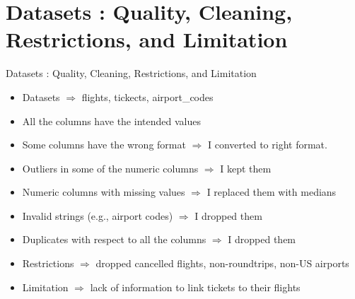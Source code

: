 \documentclass[aspectratio=1610]{beamer}
\begin{document}
\section{Datasets : Quality, Cleaning, Restrictions, and Limitation}
\begin{frame}{Datasets : Quality, Cleaning, Restrictions, and Limitation}
	\begin{itemize}
		\item Datasets $\Longrightarrow$ flights, tickects, airport\_codes
		\vspace{0.2cm}
		\item All the columns have the intended values
				\vspace{0.2cm}
		\item Some columns have the wrong format $\Longrightarrow$  I converted to right format.
				\vspace{0.2cm}
		\item Outliers in some of the numeric columns $\Longrightarrow$ I kept them
				\vspace{0.2cm}
		\item Numeric columns with missing values $\Longrightarrow$ I replaced them with medians
				\vspace{0.2cm}
		\item Invalid strings (e.g., airport codes) $\Longrightarrow$ I dropped them 
				\vspace{0.2cm}
		\item Duplicates with respect to all the columns $\Longrightarrow$ I dropped them 
				\vspace{0.2cm}
		\item Restrictions $\Longrightarrow$ dropped cancelled flights, non-roundtrips, non-US airports
				\vspace{0.2cm}
        \item Limitation $\Longrightarrow$ lack of information to link tickets to their  flights
	\end{itemize}
\end{frame}
\end{document}
